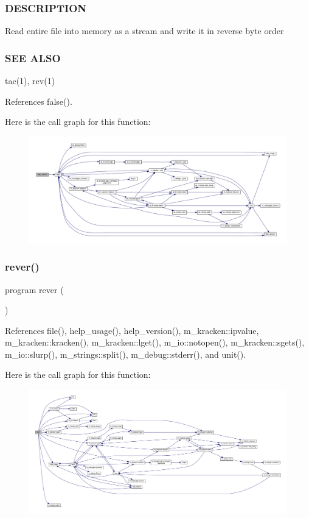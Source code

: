 \subsubsection*{D\+E\+S\+C\+R\+I\+P\+T\+I\+ON}

Read entire file into memory as a stream and write it in reverse byte order \subsubsection*{S\+EE A\+L\+SO}

tac(1), rev(1) 

References false().

Here is the call graph for this function\+:
\nopagebreak
\begin{figure}[H]
\begin{center}
\leavevmode
\includegraphics[width=350pt]{rever_8f90_a39c21619b08a3c22f19e2306efd7f766_cgraph}
\end{center}
\end{figure}
\mbox{\label{rever_8f90_aa04a8c02de71e8109e9239487c94ea6c}} 
\subsubsection{\texorpdfstring{rever()}{rever()}}
{\footnotesize\ttfamily program rever (\begin{DoxyParamCaption}{ }\end{DoxyParamCaption})}



References file(), help\+\_\+usage(), help\+\_\+version(), m\+\_\+kracken\+::ipvalue, m\+\_\+kracken\+::kracken(), m\+\_\+kracken\+::lget(), m\+\_\+io\+::notopen(), m\+\_\+kracken\+::sgets(), m\+\_\+io\+::slurp(), m\+\_\+strings\+::split(), m\+\_\+debug\+::stderr(), and unit().

Here is the call graph for this function\+:
\nopagebreak
\begin{figure}[H]
\begin{center}
\leavevmode
\includegraphics[width=350pt]{rever_8f90_aa04a8c02de71e8109e9239487c94ea6c_cgraph}
\end{center}
\end{figure}
